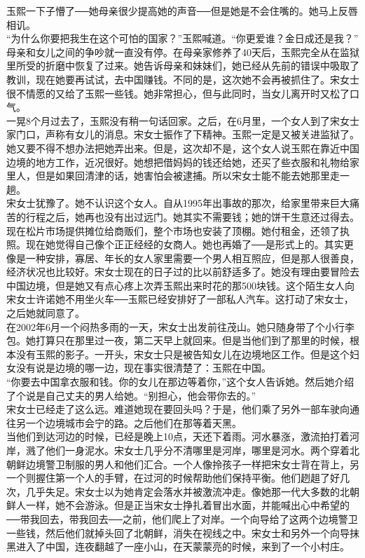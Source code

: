 玉熙一下子懵了──她母亲很少提高她的声音──但是她是不会住嘴的。她马上反唇相讥。\\

“为什么你要把我生在这个可怕的国家？”玉熙喊道。“你更爱谁？金日成还是我？”\\

母亲和女儿之间的争吵就一直没有停。在母亲家修养了40天后，玉熙完全从在监狱里所受的折磨中恢复了过来。她告诉母亲和妹妹们，她已经从先前的错误中吸取了教训，现在她要再试试，去中国赚钱。不同的是，这次她不会再被抓住了。宋女士很不情愿的又给了玉熙一些钱。她非常担心，但与此同时，当女儿离开时又松了口气。\\

一晃8个月过去了，玉熙没有稍一句话回家。之后，在6月里，一个女人到了宋女士家门口，声称有女儿的消息。宋女士振作了下精神。玉熙一定是又被关进监狱了。她又要不得不想办法把她弄出来。但是，这次却不是，这个女人说玉熙在靠近中国边境的地方工作，近况很好。她想把借妈妈的钱还给她，还买了些衣服和礼物给家里人，但是如果回清津的话，她害怕会被逮捕。所以宋女士能不能去她那里走一趟。\\

宋女士犹豫了。她不认识这个女人。自从1995年出事故的那次，给家里带来巨大痛苦的行程之后，她再也没有出过远门。她其实不需要钱；她的饼干生意还过得去。现在松片市场提供摊位给商贩们，整个市场也安装了顶棚。她付租金，还领了执照。现在她觉得自己像个正正经经的女商人。她也再婚了──是形式上的。其实更像是一种安排，寡居、年长的女人家里需要一个男人相互照应，但是那人很善良，经济状况也比较好。宋女士现在的日子过的比以前舒适多了。她没有理由要冒险去中国边境，但是她又有点心疼上次弄玉熙出来时花的那500块钱。这个陌生女人向宋女士许诺她不用坐火车──玉熙已经安排好了一部私人汽车。这打动了宋女士，之后她就同意了。\\

在2002年6月一个闷热多雨的一天，宋女士出发前往茂山。她只随身带了个小行李包。她打算只在那里过一夜，第二天早上就回来。但是当他们到了那里的时候，根本没有玉熙的影子。一开头，宋女士只是被告知女儿在边境地区工作。但是这个妇女没有说是边境的哪一边，现在事实很清楚了：玉熙在中国。\\

“你要去中国拿衣服和钱。你的女儿在那边等着你，”这个女人告诉她。然后她介绍了个说是自己丈夫的男人给她。“别担心，他会带你去的。”\\

宋女士已经走了这么远。难道她现在要回头吗？于是，他们乘了另外一部车驶向通往另一个边境城市会宁的路。之后他们在那等着天黑。\\

当他们到达河边的时候，已经是晚上10点，天还下着雨。河水暴涨，激流拍打着河岸，溅了他们一身泥水。宋女士几乎分不清哪里是河岸，哪里是河水。两个穿着北朝鲜边境警卫制服的男人和他们汇合。一个人像拎孩子一样把宋女士背在背上，另一个则握住第一个人的手臂，在过河的时候帮助他们保持平衡。他们趔趄了好几次，几乎失足。宋女士以为她肯定会落水并被激流冲走。像她那一代大多数的北朝鲜人一样，她不会游泳。但是正当宋女士挣扎着冒出水面，并能喊出心中希望的──带我回去，带我回去──之前，他们爬上了对岸。一个向导给了这两个边境警卫一些钱，然后他们就掉头回了北朝鲜，消失在视线之中。宋女士和另外一个向导抹黑进入了中国，连夜翻越了一座小山，在天蒙蒙亮的时候，来到了一个小村庄。\\

